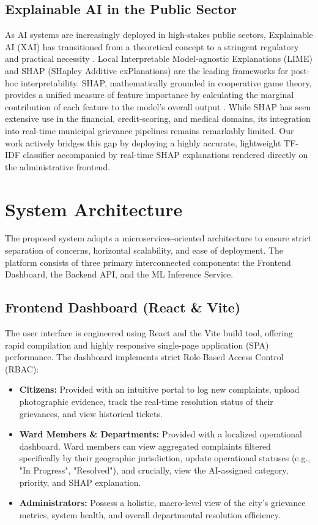 \documentclass[conference]{IEEEtran}
\begin{document}
\subsection{Explainable AI in the Public Sector}
As AI systems are increasingly deployed in high-stakes public sectors, Explainable AI (XAI) has transitioned from a theoretical concept to a stringent regulatory and practical necessity \cite{b16,b23}. Local Interpretable Model-agnostic Explanations (LIME) and SHAP (SHapley Additive exPlanations) are the leading frameworks for post-hoc interpretability. SHAP, mathematically grounded in cooperative game theory, provides a unified measure of feature importance by calculating the marginal contribution of each feature to the model's overall output \cite{b17}. While SHAP has seen extensive use in the financial, credit-scoring, and medical domains, its integration into real-time municipal grievance pipelines remains remarkably limited. Our work actively bridges this gap by deploying a highly accurate, lightweight TF-IDF classifier accompanied by real-time SHAP explanations rendered directly on the administrative frontend.

\section{System Architecture}

The proposed system adopts a microservices-oriented architecture to ensure strict separation of concerns, horizontal scalability, and ease of deployment. The platform consists of three primary interconnected components: the Frontend Dashboard, the Backend API, and the ML Inference Service.

\subsection{Frontend Dashboard (React \& Vite)}
The user interface is engineered using React and the Vite build tool, offering rapid compilation and highly responsive single-page application (SPA) performance. The dashboard implements strict Role-Based Access Control (RBAC):
\begin{itemize}
    \item \textbf{Citizens:} Provided with an intuitive portal to log new complaints, upload photographic evidence, track the real-time resolution status of their grievances, and view historical tickets.
    \item \textbf{Ward Members \& Departments:} Provided with a localized operational dashboard. Ward members can view aggregated complaints filtered specifically by their geographic jurisdiction, update operational statuses (e.g., "In Progress", "Resolved"), and crucially, view the AI-assigned category, priority, and SHAP explanation.
    \item \textbf{Administrators:} Possess a holistic, macro-level view of the city's grievance metrics, system health, and overall departmental resolution efficiency.
\end{itemize}
\end{document}
